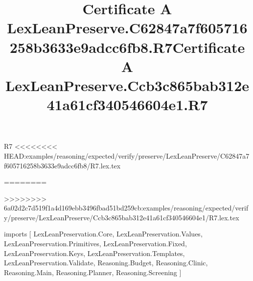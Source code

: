 \begin{lexlean}{R7}
<<<<<<<< HEAD:examples/reasoning/expected/verify/preserve/LexLeanPreserve/C62847a7f605716258b3633e9adcc6fb8/R7.lex.tex
\title{Certificate A LexLeanPreserve.C62847a7f605716258b3633e9adcc6fb8.R7}
========
\title{Certificate A LexLeanPreserve.Ccb3c865bab312e41a61cf340546604e1.R7}
>>>>>>>> 6a02d2c7d519f1a4d169ebb3496fbad51bd259cb:examples/reasoning/expected/verify/preserve/LexLeanPreserve/Ccb3c865bab312e41a61cf340546604e1/R7.lex.tex
\begin{coremodule}
imports [
  LexLeanPreservation.Core,
  LexLeanPreservation.Values,
  LexLeanPreservation.Primitives,
  LexLeanPreservation.Fixed,
  LexLeanPreservation.Keys,
  LexLeanPreservation.Templates,
  LexLeanPreservation.Validate,
  Reasoning.Budget,
  Reasoning.Clinic,
  Reasoning.Main,
  Reasoning.Planner,
  Reasoning.Screening
]


\end{coremodule}
\end{lexlean}
